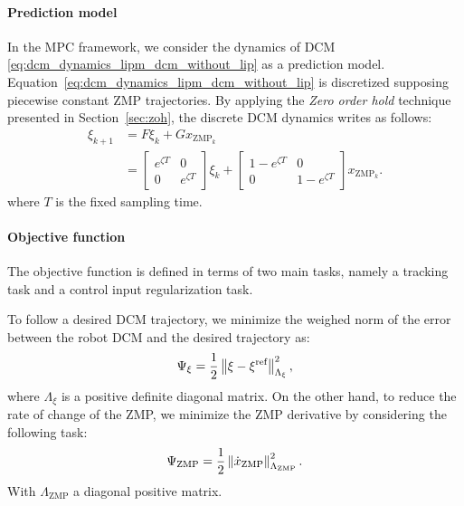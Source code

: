 \paragraph{Prediction model} In the MPC framework, we consider the dynamics of DCM \eqref{eq:dcm_dynamics_lipm_dcm_without_lip} as a prediction model. Equation~\eqref{eq:dcm_dynamics_lipm_dcm_without_lip} is discretized supposing piecewise constant ZMP trajectories. By applying the \emph{Zero order hold} technique presented in Section~\ref{sec:zoh}, the discrete DCM dynamics writes as follows:
\begin{equation}
\label{eq:dcm_discrete}
\begin{split}
\xi_{k+1} &= F \xi_k + G x_{\text{ZMP}_{k}} \\
&=
\begin{bmatrix}
e^{\zeta T} & 0 \\
0 & e^{\zeta T}
\end{bmatrix} \xi_k {+}
\begin{bmatrix}
1 - e^{\zeta T} & 0\\
0 & 1 - e^{\zeta T}
\end{bmatrix}
x_{\text{ZMP}_{k}}.
\end{split}
\end{equation}
where $T$ is the fixed sampling time. 
\paragraph{Objective function}
The objective function is defined in terms of two main tasks, namely a tracking task and a control input regularization task. 
\par
To follow a desired DCM trajectory, we minimize the weighed norm of the error between the robot DCM and the desired trajectory as:
\begin{equation}
    \label{eq:mpc_simplified_cost_dcm}
    \Psi_\xi = \frac{1}{2} \left\lVert\xi-{\xi}^\text{ref}\right\rVert_{\Lambda_\xi}^2,
\end{equation}
where $\Lambda_\xi$ is a positive definite diagonal matrix.
On the other hand, to reduce the rate of change of the ZMP, we minimize the ZMP derivative by considering the following task:
\begin{equation}
    \label{eq:mpc_simplified_cost_zmp}
    \Psi_\text{ZMP} = \frac{1}{2} \left\lVert\dot{x}_\text{ZMP}\right\rVert_{\Lambda_\text{ZMP}}^2.
\end{equation}
With $\Lambda_\text{ZMP}$ a diagonal positive matrix.


